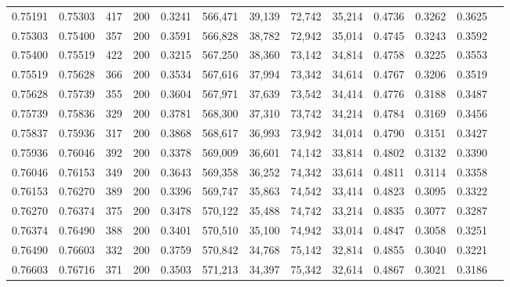 \begin{tabular}{rrrrrrrrrrrrr}
0.75191 & 0.75303 &    417 & 200 &                                     0.3241 & 566,471 &  39,139 &  72,742 &  35,214 & 0.4736 & 0.3262 & 0.3625 \\
0.75303 & 0.75400 &    357 & 200 &                                     0.3591 & 566,828 &  38,782 &  72,942 &  35,014 & 0.4745 & 0.3243 & 0.3592 \\
0.75400 & 0.75519 &    422 & 200 &                                     0.3215 & 567,250 &  38,360 &  73,142 &  34,814 & 0.4758 & 0.3225 & 0.3553 \\
0.75519 & 0.75628 &    366 & 200 &                                     0.3534 & 567,616 &  37,994 &  73,342 &  34,614 & 0.4767 & 0.3206 & 0.3519 \\
0.75628 & 0.75739 &    355 & 200 &                                     0.3604 & 567,971 &  37,639 &  73,542 &  34,414 & 0.4776 & 0.3188 & 0.3487 \\
0.75739 & 0.75836 &    329 & 200 &                                     0.3781 & 568,300 &  37,310 &  73,742 &  34,214 & 0.4784 & 0.3169 & 0.3456 \\
0.75837 & 0.75936 &    317 & 200 &                                     0.3868 & 568,617 &  36,993 &  73,942 &  34,014 & 0.4790 & 0.3151 & 0.3427 \\
0.75936 & 0.76046 &    392 & 200 &                                     0.3378 & 569,009 &  36,601 &  74,142 &  33,814 & 0.4802 & 0.3132 & 0.3390 \\
0.76046 & 0.76153 &    349 & 200 &                                     0.3643 & 569,358 &  36,252 &  74,342 &  33,614 & 0.4811 & 0.3114 & 0.3358 \\
0.76153 & 0.76270 &    389 & 200 &                                     0.3396 & 569,747 &  35,863 &  74,542 &  33,414 & 0.4823 & 0.3095 & 0.3322 \\
0.76270 & 0.76374 &    375 & 200 &                                     0.3478 & 570,122 &  35,488 &  74,742 &  33,214 & 0.4835 & 0.3077 & 0.3287 \\
0.76374 & 0.76490 &    388 & 200 &                                     0.3401 & 570,510 &  35,100 &  74,942 &  33,014 & 0.4847 & 0.3058 & 0.3251 \\
0.76490 & 0.76603 &    332 & 200 &                                     0.3759 & 570,842 &  34,768 &  75,142 &  32,814 & 0.4855 & 0.3040 & 0.3221 \\
0.76603 & 0.76716 &    371 & 200 &                                     0.3503 & 571,213 &  34,397 &  75,342 &  32,614 & 0.4867 & 0.3021 & 0.3186 \\

\end{tabular}
